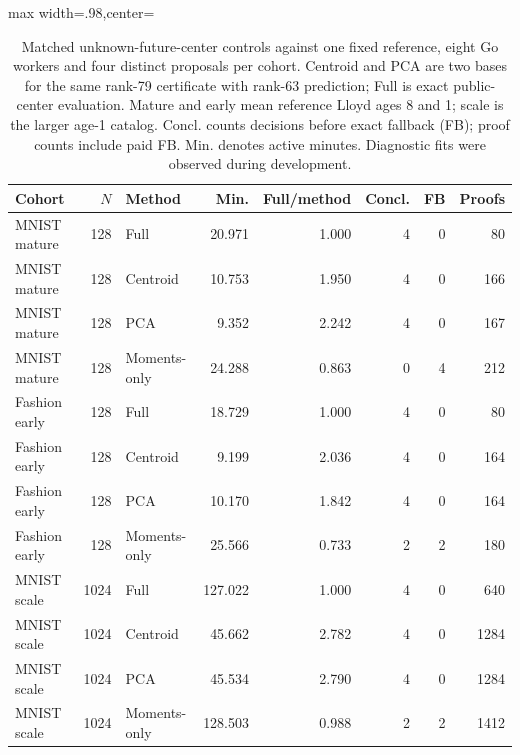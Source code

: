 \begin{table}[tbp]
\centering
\caption{Matched unknown-future-center controls against one fixed reference, eight Go workers and four distinct proposals per cohort. Centroid and PCA are two bases for the same rank-79 certificate with rank-63 prediction; Full is exact public-center evaluation. Mature and early mean reference Lloyd ages 8 and 1; scale is the larger age-1 catalog. Concl. counts decisions before exact fallback (FB); proof counts include paid FB. Min. denotes active minutes. Diagnostic fits were observed during development.}
\label{tab:matched-results}
\begin{adjustbox}{max width=.98\textwidth,center=\textwidth}
\begin{tabular}{lrlrrrrr}
\toprule
Cohort & $N$ & Method & Min. & Full/method & Concl. & FB & Proofs\\
\midrule
MNIST mature & 128 & Full & 20.971 & 1.000 & 4 & 0 & 80\\
MNIST mature & 128 & Centroid & 10.753 & 1.950 & 4 & 0 & 166\\
MNIST mature & 128 & PCA & 9.352 & 2.242 & 4 & 0 & 167\\
MNIST mature & 128 & Moments-only & 24.288 & 0.863 & 0 & 4 & 212\\
Fashion early & 128 & Full & 18.729 & 1.000 & 4 & 0 & 80\\
Fashion early & 128 & Centroid & 9.199 & 2.036 & 4 & 0 & 164\\
Fashion early & 128 & PCA & 10.170 & 1.842 & 4 & 0 & 164\\
Fashion early & 128 & Moments-only & 25.566 & 0.733 & 2 & 2 & 180\\
MNIST scale & 1024 & Full & 127.022 & 1.000 & 4 & 0 & 640\\
MNIST scale & 1024 & Centroid & 45.662 & 2.782 & 4 & 0 & 1284\\
MNIST scale & 1024 & PCA & 45.534 & 2.790 & 4 & 0 & 1284\\
MNIST scale & 1024 & Moments-only & 128.503 & 0.988 & 2 & 2 & 1412\\
\bottomrule
\end{tabular}
\end{adjustbox}
\end{table}
